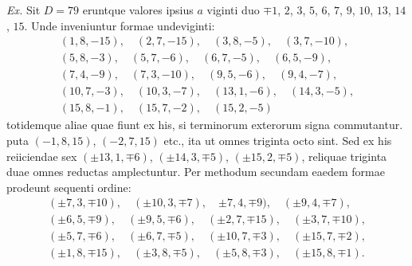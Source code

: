 \par
{}
\textit{Ex.} Sit $D=79$ eruntque valores ipsius $a$ viginti duo ${\mp1}$, $2$, $3$, $5$, $6$, $7$, $9$, $10$, $13$, $14$, $15$. Unde inveniuntur formae undeviginti:
\[
\begin{gathered}
(1,8,-15),\quad (2,7,-15),\quad {(3,8,-5)},\quad (3,7,-10),\\
(5,8,-3),\quad (5,7,-6),\quad (6,7,-5),\quad (6,5,-9),\\
(7,4,-9),\quad (7,3,-10),\quad (9,5,-6),\quad (9,4,-7),\\
(10,7,-3),\quad (10,3,-7),\quad (13,1,-6),\quad (14,3,-5),\\
(15,8,-1),\quad (15,7,-2),\quad (15,2,-5)
\end{gathered}
\]
totidemque aliae quae fiunt ex his, si terminorum exterorum signa {commutantur. puta} $(-1,8,15)$, $(-2,7,15)$ etc., ita ut omnes triginta octo sint. Sed ex his reiiciendae sex $(\pm13,1,\mp6)$, $(\pm14,3,\mp5)$, $(\pm15,2,\mp5)$, reliquae triginta duae omnes reductas amplectuntur. Per methodum secundam eaedem formae prodeunt sequenti ordine:
\[
\begin{gathered}
(\pm7,3,\mp10),\quad (\pm10,3,\mp7),\quad {\pm7,4,\mp9)},\quad (\pm9,4,\mp7),\\
(\pm6,5,\mp9),\quad (\pm9,5,\mp6),\quad (\pm2,7,\mp15),\quad (\pm3,7,\mp10),\\
(\pm5,7,\mp6),\quad (\pm6,7,\mp5),\quad (\pm10,7,\mp3),\quad (\pm15,7,\mp2),\\
(\pm1,8,\mp15),\quad (\pm3,8,\mp5),\quad (\pm5,8,\mp3),\quad (\pm15,8,\mp1).
\end{gathered}
\]

